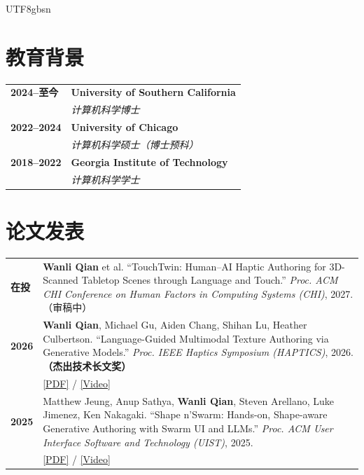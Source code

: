 \documentclass[12pt, letterpaper]{article}
\newlength{\datecolwidth}
\begin{document}
\begin{CJK*}{UTF8}{gbsn}
\section*{教育背景}
\noindent
\begin{tabularx}{\textwidth}{@{}p{\datecolwidth} X@{}}
    \textbf{2024--至今} & \textbf{University of Southern California} \\
    & \textit{计算机科学博士} \\[4pt]
    \textbf{2022--2024} & \textbf{University of Chicago} \\
    & \textit{计算机科学硕士（博士预科）} \\[4pt]
    \textbf{2018--2022} & \textbf{Georgia Institute of Technology} \\
    & \textit{计算机科学学士} \\
\end{tabularx}

\section*{论文发表}

\noindent
\begin{tabularx}{\textwidth}{@{}p{\datecolwidth} X@{}}
    
    \textbf{在投} & \textbf{Wanli Qian} et al. ``TouchTwin: Human--AI Haptic Authoring for 3D-Scanned Tabletop Scenes through Language and Touch.'' \textit{Proc. ACM CHI Conference on Human Factors in Computing Systems (CHI)}, 2027.（审稿中） \\[6pt]

    \textbf{2026} & \textbf{Wanli Qian}, Michael Gu, Aiden Chang, Shihan Lu, Heather Culbertson. ``Language-Guided Multimodal Texture Authoring via Generative Models.'' \textit{Proc. IEEE Haptics Symposium (HAPTICS)}, 2026. \textbf{（杰出技术长文奖）} \\
    & \href{https://arxiv.org/abs/2604.06489}{[PDF]} / \href{https://youtu.be/f5vz52uPw-4?si=IwPee25Zb0pjWJ3Y}{[Video]} \\[6pt]

    \textbf{2025} & Matthew Jeung, Anup Sathya, \textbf{Wanli Qian}, Steven Arellano, Luke Jimenez, Ken Nakagaki. ``Shape n'Swarm: Hands-on, Shape-aware Generative Authoring with Swarm UI and LLMs.'' \textit{Proc. ACM User Interface Software and Technology (UIST)}, 2025. \\
    & \href{https://dl.acm.org/doi/10.1145/3746059.3747781}{[PDF]} / \href{https://www.youtube.com/watch?v=5u0M9yL7tyY}{[Video]} \\[6pt]


\end{tabularx}
\end{CJK*}
\end{document}
